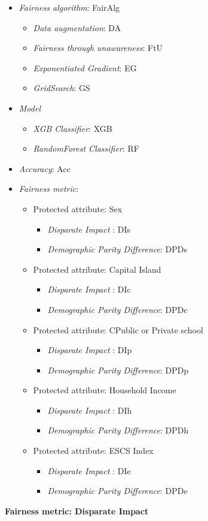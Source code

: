 \begin{itemize}
    \item \emph{Fairness algorithm}: FairAlg
    \begin{itemize}
        \item \emph{Data augmentation}: DA
        \item \emph{Fairness through unawareness}: FtU
        \item \emph{Exponentiated Gradient}: EG
        \item \emph{GridSearch}: GS
    \end{itemize}
    \item \emph{Model}
    \begin{itemize}
        \item \emph{XGB Classifier}: XGB
        \item \emph{RandomForest Classifier}: RF
    \end{itemize}
    \item \emph{Accuracy}: Acc
    \item \emph{Fairness metric}:
    \begin{itemize}
        \item Protected attribute: Sex
        \begin{itemize}
            \item \emph{Disparate Impact }: DIs
            \item \emph{Demographic Parity Difference}: DPDs
        \end{itemize}
        \item Protected attribute: Capital Island
        \begin{itemize}
            \item \emph{Disparate Impact }: DIc
            \item \emph{Demographic Parity Difference}: DPDc
        \end{itemize}
        \item Protected attribute: CPublic or Private school
        \begin{itemize}
            \item \emph{Disparate Impact }: DIp
            \item \emph{Demographic Parity Difference}: DPDp
        \end{itemize}
        \item Protected attribute: Household Income
        \begin{itemize}
            \item \emph{Disparate Impact }: DIh
            \item \emph{Demographic Parity Difference}: DPDh
        \end{itemize}
        \item Protected attribute: ESCS Index
        \begin{itemize}
            \item \emph{Disparate Impact }: DIe
            \item \emph{Demographic Parity Difference}: DPDe
        \end{itemize}
    \end{itemize}
\end{itemize}
\newpage
\textbf{Fairness metric: Disparate Impact}

